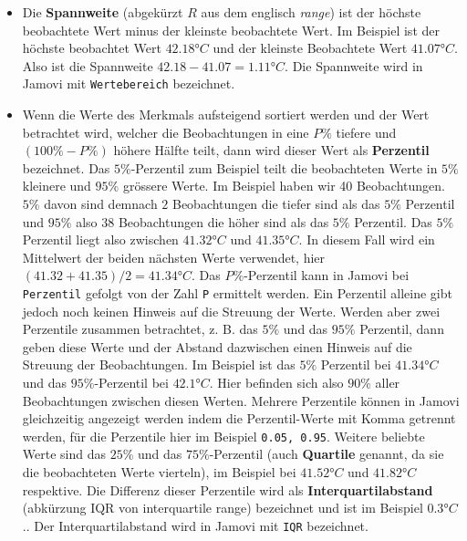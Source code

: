 \documentclass[
]{book}
\providecommand{\tightlist}{%
  \setlength{\itemsep}{0pt}\setlength{\parskip}{0pt}}
\theoremstyle{definition}
\theoremstyle{definition}
\theoremstyle{definition}
\theoremstyle{definition}
\theoremstyle{remark}
\begin{document}
\begin{itemize}
\tightlist
\item
  \label{customdef-spannweite}{Die \textbf{Spannweite} (abgekürzt \(R\) aus dem englisch \emph{range}) ist der höchste beobachtete Wert minus der kleinste beobachtete Wert}. Im Beispiel ist der höchste beobachtet Wert \(42.18° C\) und der kleinste Beobachtete Wert \(41.07° C\). Also ist die Spannweite \(42.18 - 41.07 = 1.11° C\). Die Spannweite wird in Jamovi mit \texttt{Wertebereich} bezeichnet.
\item
  \label{customdef-perzentil}{Wenn die Werte des Merkmals aufsteigend sortiert werden und der Wert betrachtet wird, welcher die Beobachtungen in eine \(P\%\) tiefere und \((100\% - P\%)\) höhere Hälfte teilt, dann wird dieser Wert als \textbf{Perzentil} bezeichnet.} Das \(5\%\)-Perzentil zum Beispiel teilt die beobachteten Werte in \(5\%\) kleinere und \(95\%\) grössere Werte. Im Beispiel haben wir 40 Beobachtungen. \(5\%\) davon sind demnach \(2\) Beobachtungen die tiefer sind als das \(5\%\) Perzentil und \(95\%\) also \(38\) Beobachtungen die höher sind als das \(5\%\) Perzentil. Das \(5\%\) Perzentil liegt also zwischen \(41.32° C\) und \(41.35° C\). In diesem Fall wird ein Mittelwert der beiden nächsten Werte verwendet, hier \((41.32 + 41.35)/2=41.34° C\). Das \(P\%\)-Perzentil kann in Jamovi bei \texttt{Perzentil} gefolgt von der Zahl \texttt{P} ermittelt werden. Ein Perzentil alleine gibt jedoch noch keinen Hinweis auf die Streuung der Werte. Werden aber zwei Perzentile zusammen betrachtet, z. B. das \(5\%\) und das \(95\%\) Perzentil, dann geben diese Werte und der Abstand dazwischen einen Hinweis auf die Streuung der Beobachtungen. Im Beispiel ist das \(5\%\) Perzentil bei \(41.34° C\) und das \(95\%\)-Perzentil bei \(42.1° C\). Hier befinden sich also \(90\%\) aller Beobachtungen zwischen diesen Werten. Mehrere Perzentile können in Jamovi gleichzeitig angezeigt werden indem die Perzentil-Werte mit Komma getrennt werden, für die Perzentile hier im Beispiel \texttt{0.05,\ 0.95}. \label{customdef-quartile}{Weitere beliebte Werte sind das \(25\%\) und das \(75\%\)-Perzentil (auch \textbf{Quartile} genannt, da sie die beobachteten Werte vierteln), im Beispiel bei \(41.52° C\) und \(41.82° C\) respektive.} \label{customdef-iqr}{Die Differenz dieser Perzentile wird als \textbf{Interquartilabstand} (abkürzung IQR von interquartile range) bezeichnet und ist im Beispiel \(0.3° C\).}. Der Interquartilabstand wird in Jamovi mit \texttt{IQR} bezeichnet.

\end{itemize}
\end{document}
